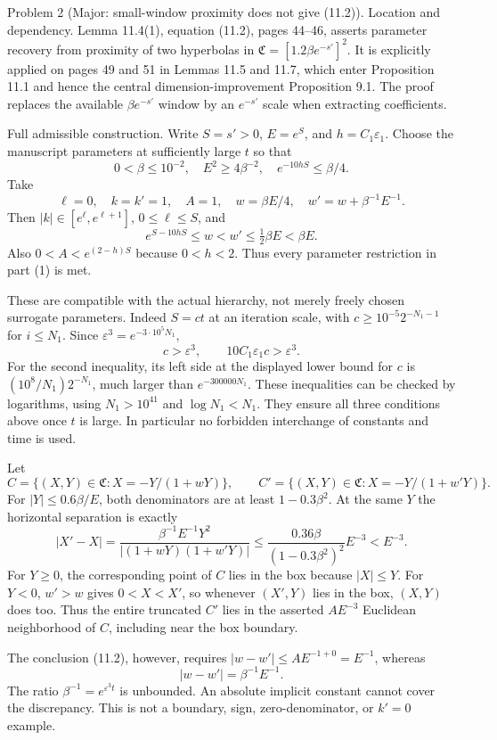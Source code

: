 \documentclass[10pt]{article}
\begin{document}
Problem 2 (Major: small-window proximity does not give (11.2)).  Location and dependency. Lemma 11.4(1), equation (11.2), pages 44–46, asserts parameter recovery from proximity of two hyperbolas in \(\mathfrak C=[1.2\beta e^{-s'}]^2\). It is explicitly applied on pages 49 and 51 in Lemmas 11.5 and 11.7, which enter Proposition 11.1 and hence the central dimension-improvement Proposition 9.1. The proof replaces the available \(\beta e^{-s'}\) window by an \(e^{-s'}\) scale when extracting coefficients.\par
Full admissible construction. Write \(S=s'>0\), \(E=e^S\), and \(h=C_1\varepsilon_1\). Choose the manuscript parameters at sufficiently large \(t\) so that \[0<\beta\leq10^{-2},\quad E^2\geq4\beta^{-2},\quad
 e^{-10hS}\leq\beta/4.\] Take \[\ell=0,\quad k=k'=1,\quad A=1,\quad
 w=\beta E/4,\quad w'=w+\beta^{-1}E^{-1}.\] Then \(|k|\in[e^\ell,e^{\ell+1}]\), \(0\leq\ell\leq S\), and \[e^{S-10hS}\leq w<w'\leq\tfrac12\beta E<\beta E.\] Also \(0<A<e^{(2-h)S}\) because \(0<h<2\). Thus every parameter restriction in part (1) is met.\par
These are compatible with the actual hierarchy, not merely freely chosen surrogate parameters. Indeed \(S=ct\) at an iteration scale, with \(c\geq10^{-5}2^{-N_1-1}\) for \(i\leq N_1\). Since \(\varepsilon^3=e^{-3\cdot10^5N_1}\), \[c>\varepsilon^3,\qquad 10C_1\varepsilon_1c>\varepsilon^3.\] For the second inequality, its left side at the displayed lower bound for \(c\) is \((10^8/N_1)2^{-N_1}\), much larger than \(e^{-300000N_1}\). These inequalities can be checked by logarithms, using \(N_1>10^{41}\) and \(\log N_1<N_1\). They ensure all three conditions above once \(t\) is large. In particular no forbidden interchange of constants and time is used.\par
Let \[C=\{(X,Y)\in\mathfrak C:X=-Y/(1+wY)\},\qquad
 C'=\{(X,Y)\in\mathfrak C:X=-Y/(1+w'Y)\}.\] For \(|Y|\leq0.6\beta/E\), both denominators are at least \(1-0.3\beta^2\). At the same \(Y\) the horizontal separation is exactly \[|X'-X|
 =\frac{\beta^{-1}E^{-1}Y^2}{|(1+wY)(1+w'Y)|}
 \leq\frac{0.36\beta}{(1-0.3\beta^2)^2}E^{-3}
 <E^{-3}.\] For \(Y\geq0\), the corresponding point of \(C\) lies in the box because \(|X|\leq Y\). For \(Y<0\), \(w'>w\) gives \(0<X<X'\), so whenever \((X',Y)\) lies in the box, \((X,Y)\) does too. Thus the entire truncated \(C'\) lies in the asserted \(AE^{-3}\) Euclidean neighborhood of \(C\), including near the box boundary.\par
The conclusion (11.2), however, requires \(|w-w'|\leq AE^{-1+0}=E^{-1}\), whereas \[|w-w'|=\beta^{-1}E^{-1}.\] The ratio \(\beta^{-1}=e^{\varepsilon^3t}\) is unbounded. An absolute implicit constant cannot cover the discrepancy. This is not a boundary, sign, zero-denominator, or \(k'=0\) example.\par
\end{document}
